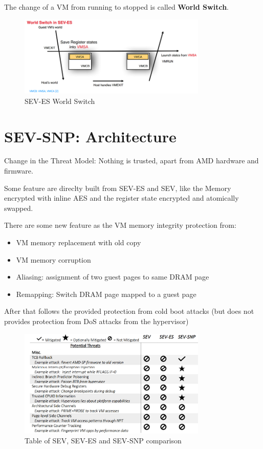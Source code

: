 The change of a VM from running to stopped is called \textbf{World Switch}.
\begin{figure}[h]
    \centering
    \includegraphics[width=0.8\textwidth]{img/world-switch-es.png}
    \caption{SEV-ES World Switch}
    \label{fig:world_switch_es}
\end{figure}

\section{SEV-SNP: Architecture}
\begin{boxH}
    Change in the Threat Model: Nothing is trusted, apart from AMD hardware and firmware.
\end{boxH}

Some feature are direclty built from SEV-ES and SEV, like the Memory encrypted with inline AES and the register state encrypted and atomically swapped. \bigskip

There are some new feature as the VM memory integrity protection from:
\begin{itemize}
    \item VM memory replacement with old copy
    \item VM memory corruption
    \item Aliasing: assignment of two guest pages to same DRAM page
    \item Remapping: Switch DRAM page mapped to a guest page
\end{itemize}

After that follows the provided protection from cold boot attacks (but does not provides protection from DoS attacks from the hypervisor)

\begin{figure}[h]
    \centering
    \includegraphics[width=0.8\textwidth]{img/SEV-comp.png}
    \caption{Table of SEV, SEV-ES and SEV-SNP comparison}
    \label{fig:sev_comp}
\end{figure}

